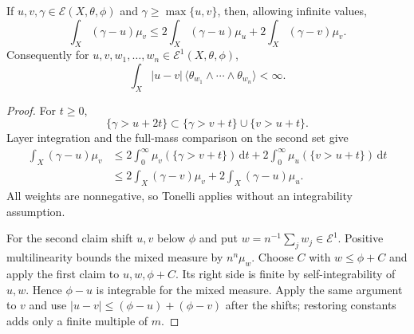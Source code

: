 \begin{lemma}\label{lem:relative-cross-energy-estimate}
If $u,v,\gamma\in\mathcal E(X,\theta,\phi)$ and $\gamma\geq\max\{u,v\}$, then, allowing infinite values,
\[
 \int_X(\gamma-u)\mu_v
       \leq2\int_X(\gamma-u)\mu_u
                          +2\int_X(\gamma-v)\mu_v.
\]
Consequently for $u,v,w_1,\ldots,w_n\in\mathcal E^1(X,\theta,\phi)$,
\[
 \int_X|u-v|\,\langle\theta_{w_1}\wedge\cdots\wedge\theta_{w_n}\rangle<\infty.
\]
\end{lemma}
\begin{proof}
For $t\geq0$,
\[
 \{\gamma>u+2t\}\subset
                     \{\gamma>v+t\}\cup\{v>u+t\}.
\]
Layer integration and the full-mass comparison on the second set give
\[
 \begin{split}
 \int_X(\gamma-u)\mu_v
  &\leq2\int_0^\infty\mu_v(\{\gamma>v+t\})\,\mathrm dt
          +2\int_0^\infty\mu_u(\{v>u+t\})\,\mathrm dt\\
  &\leq2\int_X(\gamma-v)\mu_v+2\int_X(\gamma-u)\mu_u.
 \end{split}
\]
All weights are nonnegative, so Tonelli applies without an integrability assumption.

For the second claim shift $u,v$ below $\phi$ and put $w=n^{-1}\sum_jw_j\in\mathcal E^1$. Positive multilinearity bounds the mixed measure by $n^n\mu_w$. Choose $C$ with $w\leq\phi+C$ and apply the first claim to $u,w,\phi+C$. Its right side is finite by self-integrability of $u,w$. Hence $\phi-u$ is integrable for the mixed measure. Apply the same argument to $v$ and use $|u-v|\leq(\phi-u)+(\phi-v)$ after the shifts; restoring constants adds only a finite multiple of $m$.
\end{proof}

